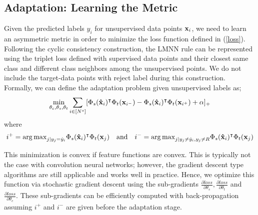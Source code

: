 \subsection{Adaptation: Learning the Metric}
\label{metric}
Given the predicted labels $y_i$ for unsupervised data points $\mathbf{x}_i$, we need to learn an asymmetric metric in order to minimize the loss function defined in (\ref{loss}). Following the cyclic consistency construction, the LMNN rule can be represented using the triplet loss defined with supervised data points and their closest same class and different class neighbors among the unsupervised points. We do not include the target-data points with reject label during this construction. Formally, we can define the adaptation problem given unsupervised labels as;
\begin{equation}
\begin{aligned}
\min_{\theta_c,\theta_s,\theta_t} &\sum_{i \in [N^s]} [\Phi_s(\mathbf{\hat{x}}_i)^\intercal \Phi_t(\mathbf{x}_{i^-}) -\Phi_s(\mathbf{\hat{x}}_i)^\intercal \Phi_t(\mathbf{x}_{i^+}) + \alpha]_{+} \\
\end{aligned}
\end{equation}
where 
\begin{equation}
i^{+} = {\arg\max}_{j | y_j = \hat{y}_i} \Phi_s(\mathbf{\hat{x}}_i)^\intercal \Phi_t(\mathbf{x}_j) \quad  \text{and} \quad   i^{-} = {\arg\max}_{j | y_j \neq \hat{y}_i, y_j \neq R}  \Phi_s(\mathbf{\hat{x}}_i)^\intercal \Phi_t(\mathbf{x}_j)
\label{sup_nn}
\end{equation}

This minimization is convex if feature functions are convex. This is typically not the case with convolution neural networks; however, the gradient descent type algorithms are still applicable and works well in practice. Hence, we optimize this function via stochastic gradient descent using the sub-gradients $\frac{\partial loss}{\partial \theta_s}, \frac{\partial loss}{\partial \theta_t}$ and $\frac{\partial loss}{\partial \theta_c}$. These sub-gradients can be efficiently computed with back-propagation assuming $i^{+}$ and $i^{-}$ are given before the adaptation stage.
  